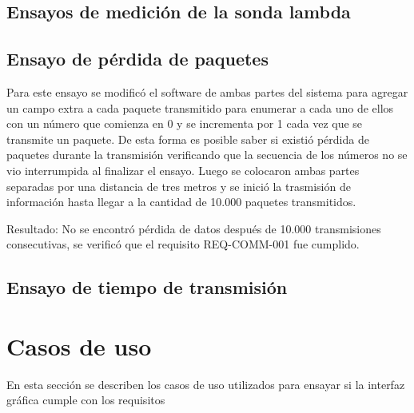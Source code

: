 \subsection{Ensayos de medición de la sonda lambda}



\subsection{Ensayo de pérdida de paquetes}

Para este ensayo se modificó el software de ambas partes del sistema para agregar un campo extra a cada paquete transmitido para enumerar a cada uno de ellos con un número que comienza en 0 y se incrementa por 1 cada vez que se transmite un paquete. De esta forma es posible saber si existió pérdida de paquetes durante la transmisión verificando que la secuencia de los números no se vio interrumpida al finalizar el ensayo. Luego se colocaron ambas partes separadas por una distancia de tres metros y se inició la trasmisión de información hasta llegar a la cantidad de 10.000 paquetes transmitidos. 

Resultado: No se encontró pérdida de datos después de 10.000 transmisiones consecutivas, se verificó que el requisito REQ-COMM-001 fue cumplido.

\subsection{Ensayo de tiempo de transmisión}


\section{Casos de uso}

En esta sección se describen los casos de uso utilizados para ensayar si la interfaz gráfica cumple con los requisitos

